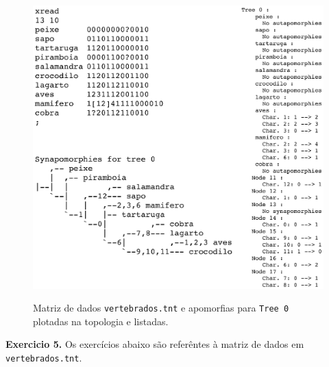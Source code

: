 \begin{refsection}
  \begin{figure}[H]
      {\includegraphics[scale=0.80]{figures/tut5/vertebrados_apo_tree_0.eps}}
	{\caption[Apomorfias para \texttt{Tree 0} em \texttt{vertebrados.tnt}]{Matriz de dados \texttt{vertebrados.tnt} e apomorfias para \texttt{Tree 0} plotadas na topologia e listadas.}\label{tut5:fig:apo_tree0}} 
  \end{figure}



\begin{blackBlock}{\textbf{Exercicio 5.}}\label{tut4:ex:5.4}
	Os exercícios abaixo são referêntes à matriz de dados em \texttt{vertebrados.tnt}.
\end{blackBlock}



\end{refsection}
